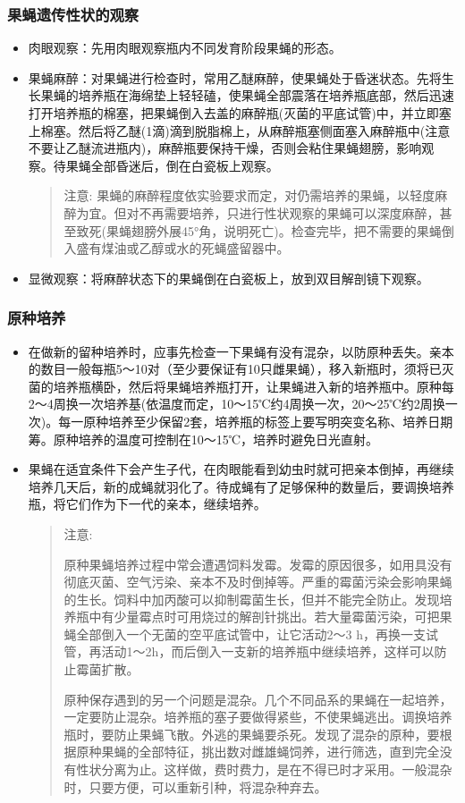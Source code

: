 \documentclass[AutoFakeBold]{LZUThesis}
\begin{document}
\subsubsection{果蝇遗传性状的观察}
\begin{itemize}
    \item 肉眼观察：先用肉眼观察瓶内不同发育阶段果蝇的形态。
    \item 果蝇麻醉：对果蝇进行检查时，常用乙醚麻醉，使果蝇处于昏迷状态。先将生长果蝇的培养瓶在海绵垫上轻轻磕，使果蝇全部震落在培养瓶底部，然后迅速打开培养瓶的棉塞，把果蝇倒入去盖的麻醉瓶(灭菌的平底试管)中，并立即塞上棉塞。然后将乙醚(1滴)滴到脱脂棉上，从麻醉瓶塞侧面塞入麻醉瓶中(注意不要让乙醚流进瓶内)，麻醉瓶要保持干燥，否则会粘住果蝇翅膀，影响观察。待果蝇全部昏迷后，倒在白瓷板上观察。
    \begin{quote}
    注意: 果蝇的麻醉程度依实验要求而定，对仍需培养的果蝇，以轻度麻醉为宜。但对不再需要培养，只进行性状观察的果蝇可以深度麻醉，甚至致死(果蝇翅膀外展45°角，说明死亡)。检查完毕，把不需要的果蝇倒入盛有煤油或乙醇或水的死蝇盛留器中。
    \end{quote}
    \item 显微观察：将麻醉状态下的果蝇倒在白瓷板上，放到双目解剖镜下观察。
\end{itemize}

\subsubsection{原种培养}
\begin{itemize}
    \item 在做新的留种培养时，应事先检查一下果蝇有没有混杂，以防原种丢失。亲本的数目一般每瓶5～10对（至少要保证有10只雌果蝇），移入新瓶时，须将已灭菌的培养瓶横卧，然后将果蝇培养瓶打开，让果蝇进入新的培养瓶中。原种每2～4周换一次培养基(依温度而定，10～15℃约4周换一次，20～25℃约2周换一次)。每一原种培养至少保留2套，培养瓶的标签上要写明突变名称、培养日期筹。原种培养的温度可控制在10～15℃，培养时避免日光直射。
    \item 果蝇在适宜条件下会产生子代，在肉眼能看到幼虫时就可把亲本倒掉，再继续培养几天后，新的成蝇就羽化了。待成蝇有了足够保种的数量后，要调换培养瓶，将它们作为下一代的亲本，继续培养。
    \begin{quote}
    注意:\par
    原种果蝇培养过程中常会遭遇饲料发霉。发霉的原因很多，如用具没有彻底灭菌、空气污染、亲本不及时倒掉等。严重的霉菌污染会影响果蝇的生长。饲料中加丙酸可以抑制霉菌生长，但并不能完全防止。发现培养瓶中有少量霉点时可用烧过的解剖针挑出。若大量霉菌污染，可把果蝇全部倒入一个无菌的空平底试管中，让它活动2～3 h，再换一支试管，再活动1～2h，而后倒入一支新的培养瓶中继续培养，这样可以防止霉菌扩散。\par
    原种保存遇到的另一个问题是混杂。几个不同品系的果蝇在一起培养，一定要防止混杂。培养瓶的塞子要做得紧些，不使果蝇逃出。调换培养瓶时，要防止果蝇飞散。外逃的果蝇要杀死。发现了混杂的原种，要根据原种果蝇的全部特征，挑出数对雌雄蝇饲养，进行筛选，直到完全没有性状分离为止。这样做，费时费力，是在不得已时才采用。一般混杂时，只要方便，可以重新引种，将混杂种弃去。\par
    \end{quote}
\end{itemize}
\end{document}
